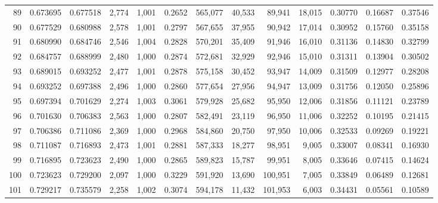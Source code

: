 \begin{tabular}{rrrrrrrrrrrrr}
89  &  0.673695 &  0.677518 &   2,774 &  1,001 &                                     0.2652 &  565,077 &   40,533 &   89,941 &   18,015 &  0.30770 &  0.16687 &  0.37546 \\
90  &  0.677529 &  0.680988 &   2,578 &  1,001 &                                     0.2797 &  567,655 &   37,955 &   90,942 &   17,014 &  0.30952 &  0.15760 &  0.35158 \\
91  &  0.680990 &  0.684746 &   2,546 &  1,004 &                                     0.2828 &  570,201 &   35,409 &   91,946 &   16,010 &  0.31136 &  0.14830 &  0.32799 \\
92  &  0.684757 &  0.688999 &   2,480 &  1,000 &                                     0.2874 &  572,681 &   32,929 &   92,946 &   15,010 &  0.31311 &  0.13904 &  0.30502 \\
93  &  0.689015 &  0.693252 &   2,477 &  1,001 &                                     0.2878 &  575,158 &   30,452 &   93,947 &   14,009 &  0.31509 &  0.12977 &  0.28208 \\
94  &  0.693252 &  0.697388 &   2,496 &  1,000 &                                     0.2860 &  577,654 &   27,956 &   94,947 &   13,009 &  0.31756 &  0.12050 &  0.25896 \\
95  &  0.697394 &  0.701629 &   2,274 &  1,003 &                                     0.3061 &  579,928 &   25,682 &   95,950 &   12,006 &  0.31856 &  0.11121 &  0.23789 \\
96  &  0.701630 &  0.706383 &   2,563 &  1,000 &                                     0.2807 &  582,491 &   23,119 &   96,950 &   11,006 &  0.32252 &  0.10195 &  0.21415 \\
97  &  0.706386 &  0.711086 &   2,369 &  1,000 &                                     0.2968 &  584,860 &   20,750 &   97,950 &   10,006 &  0.32533 &  0.09269 &  0.19221 \\
98  &  0.711087 &  0.716893 &   2,473 &  1,001 &                                     0.2881 &  587,333 &   18,277 &   98,951 &    9,005 &  0.33007 &  0.08341 &  0.16930 \\
99  &  0.716895 &  0.723623 &   2,490 &  1,000 &                                     0.2865 &  589,823 &   15,787 &   99,951 &    8,005 &  0.33646 &  0.07415 &  0.14624 \\
100 &  0.723623 &  0.729200 &   2,097 &  1,000 &                                     0.3229 &  591,920 &   13,690 &  100,951 &    7,005 &  0.33849 &  0.06489 &  0.12681 \\
101 &  0.729217 &  0.735579 &   2,258 &  1,002 &                                     0.3074 &  594,178 &   11,432 &  101,953 &    6,003 &  0.34431 &  0.05561 &  0.10589 \\

\end{tabular}
